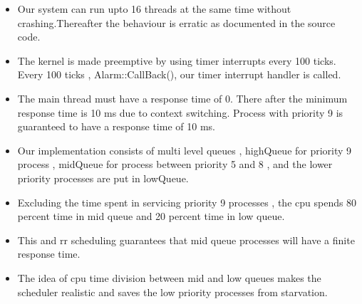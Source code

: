 \documentclass{article}
\begin{document}
\begin{itemize}
\item Our system can run upto 16 threads at the same time without crashing.Thereafter the behaviour is erratic as documented in the source code. 
\item The kernel is made preemptive by using timer interrupts every 100 ticks. Every 100 ticks , Alarm::CallBack(), our timer interrupt handler is called.
\item The main thread must have a response time of 0. There after the minimum response time is 10 ms due to context switching. Process with priority 9 is guaranteed to have a response time of 10 ms.
\item Our implementation consists of multi level queues , highQueue for priority 9 process , midQueue for process between priority 5 and 8 , and the lower priority processes are put in lowQueue.
\item Excluding the time spent in servicing priority 9 processes , the cpu spends 80 percent time in mid queue and 20 percent time in low queue.
\item This and rr scheduling guarantees that mid queue processes will have a finite response time.
\item The idea of cpu time division between mid and low queues makes the scheduler realistic and saves the low priority processes from starvation.

\end{itemize}
 
\end{document}
